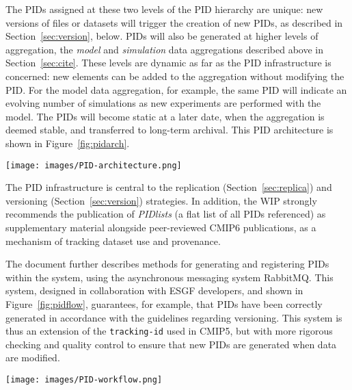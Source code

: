 \documentclass[gmd,manuscript]{copernicus}
\newcommand{\figref}[1] {\mbox{Figure   \ref{fig:#1}}}
\newcommand{\secref}[1] {\mbox{Section  \ref{sec:#1}}}
\begin{document}
The PIDs assigned at these two levels of the PID hierarchy are unique:
new versions of files or datasets will trigger the creation of new
PIDs, as described in \secref{version}, below. PIDs will also be
generated at higher levels of aggregation, the \emph{model} and
\emph{simulation} data aggregations described above in \secref{cite}.
These levels are dynamic as far as the PID infrastructure is concerned: 
new elements can be added to the aggregation without modifying the PID. 
For the model data aggregation, for example, the same PID will indicate 
an evolving number of simulations as new experiments are performed with 
the model. The PIDs will become static at a later date, when the 
aggregation is deemed stable, and transferred to long-term archival. 
This PID architecture is shown in \figref{pidarch}.

\begin{figure*}
  \begin{center}
    \texttt{[image: images/PID-architecture.png]}
  \end{center}
  \caption{PID architecture, showing layers in the PID hierarchy. In
    the lower layers of the hierarchy, PIDs are static once generated,
    and new datasets generate new versions with new PIDs. Figure
    courtesy Tobias Weigel.}
  \label{fig:pidarch}
\end{figure*}

The PID infrastructure is central to the replication
(\secref{replica}) and versioning (\secref{version}) strategies. In
addition, the WIP strongly recommends the publication of
\emph{PIDlists} (a flat list of all PIDs referenced) as supplementary
material alongside peer-reviewed CMIP6 publications, as a mechanism of
tracking dataset use and provenance.

The document further describes methods for generating and registering
PIDs within the system, using the asynchronous messaging system
RabbitMQ. This system, designed in collaboration with ESGF developers,
and shown in \figref{pidflow}, guarantees, for example, that PIDs have
been correctly generated in accordance with the guidelines regarding
versioning. This system is thus an extension of the
\texttt{tracking-id} used in CMIP5, but with more rigorous checking
and quality control to ensure that new PIDs are generated when data
are modified.

\begin{figure*}
  \begin{center}
    \texttt{[image: images/PID-workflow.png]}
  \end{center}
  \caption{PID workflow, showing the generation and registry of PIDs,
    with checkpoints where compliance is assured. Figure courtesy
    Tobias Weigel.}
  \label{fig:pidflow}
\end{figure*}
\end{document}
